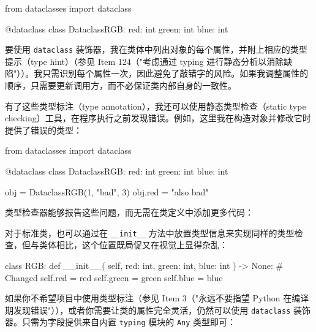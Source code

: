 \begin{codebox}[python]
from dataclasses import dataclass

@dataclass
class DataclassRGB:
    red: int
    green: int
    blue: int
\end{codebox}

要使用 \texttt{dataclass} 装饰器，我在类体中列出对象的每个属性，并附上相应的类型提示（type hint）（参见 Item 124（"考虑通过 typing 进行静态分析以消除缺陷"））。我只需识别每个属性一次，因此避免了敲错字的风险。如果我调整属性的顺序，只需要更新调用方，而不必保证类内部自身的一致性。

有了这些类型标注（type annotation），我还可以使用静态类型检查（static type checking）工具，在程序执行之前发现错误。例如，这里我在构造对象并修改它时提供了错误的类型：

\begin{codebox}[python]
from dataclasses import dataclass

@dataclass
class DataclassRGB:
    red: int
    green: int
    blue: int

obj = DataclassRGB(1, "bad", 3)
obj.red = "also bad"
\end{codebox}

类型检查器能够报告这些问题，而无需在类定义中添加更多代码：


对于标准类，也可以通过在 \texttt{\_\_init\_\_} 方法中放置类型信息来实现同样的类型检查，但与类体相比，这个位置既局促又在视觉上显得杂乱：

\begin{codebox}[python]
class RGB:
    def __init__(
        self, red: int, green: int, blue: int
    ) -> None:  # Changed
        self.red = red
        self.green = green
        self.blue = blue
\end{codebox}

如果你不希望项目中使用类型标注（参见 Item 3（"永远不要指望 Python 在编译期发现错误"）），或者你需要让类的属性完全灵活，仍然可以使用 \texttt{dataclass} 装饰器。只需为字段提供来自内置 \texttt{typing} 模块的 \texttt{Any} 类型即可：

